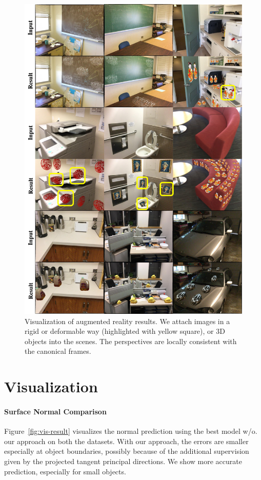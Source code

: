 \begin{figure}
\begin{minipage}{0.49\linewidth}
    \label{fig:vis-result}
\end{minipage}
\begin{minipage}{0.49\linewidth}
    \centering
    \includegraphics[width=\linewidth]{FrameNet/graph/ar-supplemental.pdf}
    \caption{Visualization of augmented reality results. We attach images in a rigid or deformable way (highlighted with yellow square), or 3D objects into the scenes. The perspectives are locally consistent with the canonical frames.}
    \label{fig:ar}
\end{minipage}
\end{figure}


\section{Visualization}
\paragraph{Surface Normal Comparison} Figure~\ref{fig:vis-result} visualizes the normal prediction using the best model w/o. our approach on both the datasets. With our approach, the errors are smaller especially at object boundaries, possibly because of the additional supervision given by the projected tangent principal directions. We show more accurate prediction, especially for small objects.

